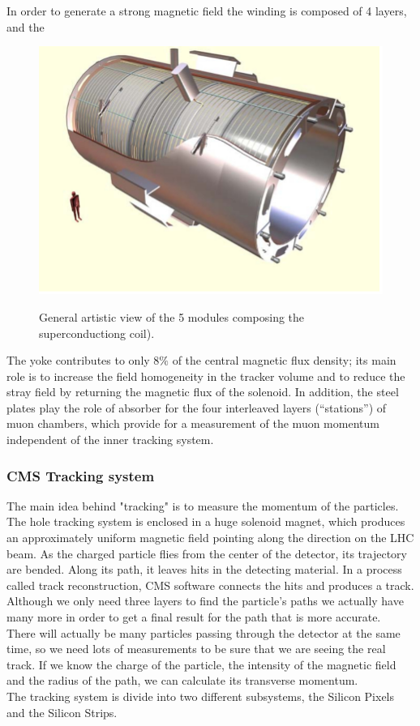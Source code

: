 In order to generate a strong magnetic field the winding is composed of 4 layers, and the 

\begin{figure}[H]
  \centering
\includegraphics[width=12cm]{CMS_chapter_plots/coil}
\label{coil}\caption{General artistic view of the 5 modules composing the superconductiong coil).}
\end{figure}




The yoke contributes to only 8$\%$ of the central magnetic flux density; its main role
is to increase the field homogeneity in the tracker volume and to reduce the stray field by returning
the magnetic flux of the solenoid. In addition, the steel plates play the role of absorber for the four
interleaved layers (“stations”) of muon chambers, which provide for a measurement of the muon
momentum independent of the inner tracking system.




\subsubsection{CMS Tracking system}

The main idea behind "tracking" is to measure the momentum of the particles. The hole tracking system is enclosed in a huge solenoid magnet, which produces an approximately uniform magnetic field pointing along the direction on the LHC beam. As the charged particle flies from the center of the detector, its trajectory are bended. Along its path, it leaves hits in the detecting material.
In a process called track reconstruction, CMS software connects the hits and produces a track. Although we only need three layers to find the particle's paths we actually have many more in order to get a final result for the path that is more accurate.\\
\indent
There will actually be many particles passing through the detector at the same time, so we need lots of measurements to be sure that we are seeing the real track.
If we know the charge of the particle, the intensity of the magnetic field and the radius of the path, we can calculate its transverse momentum.\\
\indent
The tracking system is divide into two different subsystems, the Silicon Pixels and the Silicon Strips.

